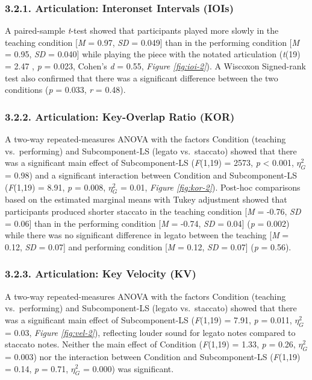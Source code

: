 \documentclass[
  english,
  man,floatsintext]{apa6}
\begin{document}
\hypertarget{articulation-interonset-intervals-iois-1}{%
\subsubsection{3.2.1. Articulation: Interonset Intervals (IOIs)}\label{articulation-interonset-intervals-iois-1}}

A paired-sample \emph{t}-test showed that participants played more slowly in the teaching condition {[}\emph{M} = 0.97, \emph{SD} = 0.049{]} than in the performing condition {[}\emph{M} = 0.95, \emph{SD} = 0.040{]} while playing the piece with the notated articulation (\emph{t}(19) = 2.47
, \emph{p} = 0.023, Cohen's \emph{d} = 0.55, \emph{Figure \ref{fig:ioi-2}}). A Wiscoxon Signed-rank test also confirmed that there was a significant difference between the two conditions (\emph{p} = 0.033, \emph{r} = 0.48).

\hypertarget{articulation-key-overlap-ratio-kor}{%
\subsubsection{3.2.2. Articulation: Key-Overlap Ratio (KOR)}\label{articulation-key-overlap-ratio-kor}}

A two-way repeated-measures ANOVA with the factors Condition (teaching vs.~performing) and Subcomponent-LS (legato vs.~staccato) showed that there was a significant main effect of Subcomponent-LS (\emph{F}(1,19) = 2573, \emph{p} \textless{} 0.001, \(\eta_G^2\) = 0.98) and a significant interaction between Condition and Subcomponent-LS (\emph{F}(1,19) = 8.91, \emph{p} = 0.008, \(\eta_G^2\) = 0.01, \emph{Figure \ref{fig:kor-2}}). Post-hoc comparisons based on the estimated marginal means with Tukey adjustment showed that participants produced shorter staccato in the teaching condition {[}\emph{M} = -0.76, \emph{SD} = 0.06{]} than in the performing condition {[}\emph{M} = -0.74, \emph{SD} = 0.04{]} (\emph{p} = 0.002) while there was no significant difference in legato between the teaching {[}\emph{M} = 0.12, \emph{SD} = 0.07{]} and performing condition {[}\emph{M} = 0.12, \emph{SD} = 0.07{]} (\emph{p} = 0.56).

\hypertarget{articulation-key-velocity-kv-1}{%
\subsubsection{3.2.3. Articulation: Key Velocity (KV)}\label{articulation-key-velocity-kv-1}}

A two-way repeated-measures ANOVA with the factors Condition (teaching vs.~performing) and Subcomponent-LS (legato vs.~staccato) showed that there was a significant main effect of Subcomponent-LS (\emph{F}(1,19) = 7.91, \emph{p} = 0.011, \(\eta_G^2\) = 0.03, \emph{Figure \ref{fig:vel-2}}), reflecting louder sound for legato notes compared to staccato notes. Neither the main effect of Condition (\emph{F}(1,19) = 1.33, \emph{p} = 0.26, \(\eta_G^2\) = 0.003) nor the interaction between Condition and Subcomponent-LS (\emph{F}(1,19) = 0.14, \emph{p} = 0.71, \(\eta_G^2\) = 0.000) was significant.
\end{document}
